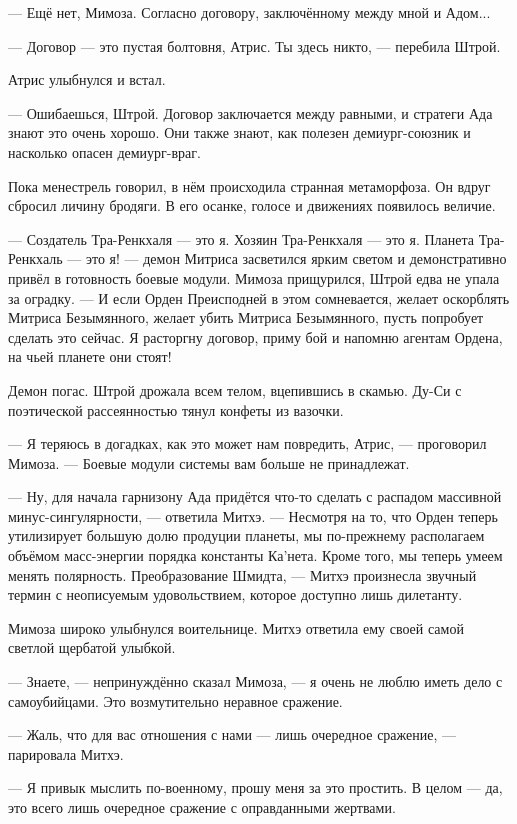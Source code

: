 --- Ещё нет, Мимоза.
Согласно договору, заключённому между мной и Адом...

--- Договор --- это пустая болтовня, Атрис.
Ты здесь никто, --- перебила Штрой.

Атрис улыбнулся и встал.

--- Ошибаешься, Штрой.
Договор заключается между равными, и стратеги Ада знают это очень хорошо.
Они также знают, как полезен демиург-союзник и насколько опасен демиург-враг.

Пока менестрель говорил, в нём происходила странная метаморфоза.
Он вдруг сбросил личину бродяги.
В его осанке, голосе и движениях появилось величие.

--- Создатель Тра-Ренкхаля --- это я.
Хозяин Тра-Ренкхаля --- это я.
Планета Тра-Ренкхаль --- это я! --- демон Митриса засветился ярким светом и демонстративно привёл в готовность боевые модули.
Мимоза прищурился, Штрой едва не упала за оградку.
--- И если Орден Преисподней в этом сомневается, желает оскорблять Митриса Безымянного, желает убить Митриса Безымянного, пусть попробует сделать это сейчас.
Я расторгну договор, приму бой и напомню агентам Ордена, на чьей планете они стоят!

Демон погас.
Штрой дрожала всем телом, вцепившись в скамью.
Ду-Си с поэтической рассеянностью тянул конфеты из вазочки.

--- Я теряюсь в догадках, как это может нам повредить, Атрис, --- проговорил Мимоза.
--- Боевые модули системы вам больше не принадлежат.

--- Ну, для начала гарнизону Ада придётся что-то сделать с распадом массивной минус-сингулярности, --- ответила Митхэ.
--- Несмотря на то, что Орден теперь утилизирует большую долю продуции планеты, мы по-прежнему располагаем объёмом масс-энергии порядка константы Ка'нета.
Кроме того, мы теперь умеем менять полярность.
Преобразование Шмидта, --- Митхэ произнесла звучный термин с неописуемым удовольствием, которое доступно лишь дилетанту.

Мимоза широко улыбнулся воительнице.
Митхэ ответила ему своей самой светлой щербатой улыбкой.

--- Знаете, --- непринуждённо сказал Мимоза, --- я очень не люблю иметь дело с самоубийцами.
Это возмутительно неравное сражение.

--- Жаль, что для вас отношения с нами --- лишь очередное сражение, --- парировала Митхэ.

--- Я привык мыслить по-военному, прошу меня за это простить.
В целом --- да, это всего лишь очередное сражение с оправданными жертвами.

